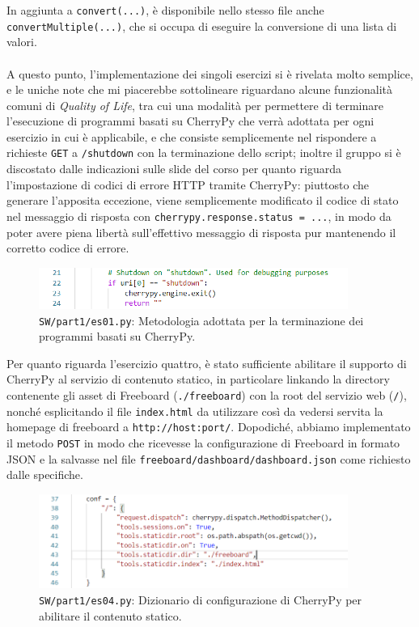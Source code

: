 \documentclass[12pt,a4paper]{article}
\begin{document}
\noindent In aggiunta a \verb|convert(...)|, è disponibile nello stesso file anche \verb|convertMultiple(...)|, che si occupa di eseguire la conversione di una lista di valori.
\\ \\
A questo punto, l'implementazione dei singoli esercizi si è rivelata molto semplice, e le uniche note che mi piacerebbe sottolineare riguardano alcune funzionalità comuni di \textit{Quality of Life}, tra cui una modalità per permettere di terminare l'esecuzione di programmi basati su CherryPy che verrà adottata per ogni esercizio in cui è applicabile, e che consiste semplicemente nel rispondere a richieste \verb|GET| a \verb|/shutdown| con la terminazione dello script; inoltre il gruppo si è discostato dalle indicazioni sulle slide del corso per quanto riguarda l'impostazione di codici di errore HTTP tramite CherryPy: piuttosto che generare l'apposita eccezione, viene semplicemente modificato il codice di stato nel messaggio di risposta con \verb|cherrypy.response.status = ...|, in modo da poter avere piena libertà sull'effettivo messaggio di risposta pur mantenendo il corretto codice di errore.

\begin{figure}[h]
    \centering
    \includegraphics[width=0.9\textwidth]{shutdown.png}
    \caption*{\texttt{SW/part1/es01.py}: Metodologia adottata per la terminazione dei programmi basati su CherryPy.}
    \label{fig:shutdown}
\end{figure}

Per quanto riguarda l'esercizio quattro, è stato sufficiente abilitare il supporto di CherryPy al servizio di contenuto statico, in particolare linkando la directory contenente gli asset di Freeboard (\verb|./freeboard|) con la root del servizio web (\verb|/|), nonché esplicitando il file \verb|index.html| da utilizzare così da vedersi servita la homepage di freeboard a \verb|http://host:port/|. Dopodiché, abbiamo implementato il metodo \verb|POST| in modo che ricevesse la configurazione di Freeboard in formato JSON e la salvasse nel file \verb|freeboard/dashboard/dashboard.json| come richiesto dalle specifiche.

\begin{figure}[h]
    \centering
    \includegraphics[width=0.9\textwidth]{static.png}
    \caption*{\texttt{SW/part1/es04.py}: Dizionario di configurazione di CherryPy per abilitare il contenuto statico.}
    \label{fig:static}
\end{figure}
\end{document}
